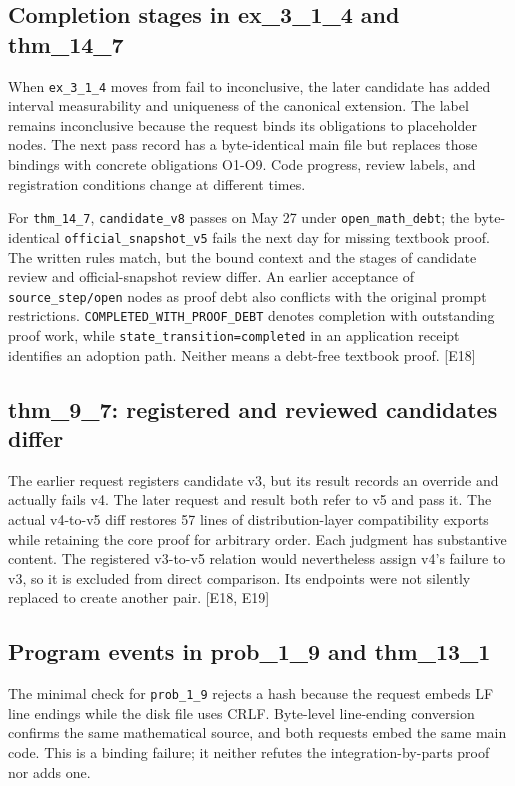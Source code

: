 \subsection[Completion stages in ex\_3\_1\_4 and thm\_14\_7]{\texorpdfstring{\protect\hypertarget{b6}{}Completion stages in ex\_3\_1\_4 and thm\_14\_7}{Completion stages in ex\_3\_1\_4 and thm\_14\_7}}
When \nolinkurl{ex_3_1_4} moves from fail to inconclusive, the later candidate has added interval measurability and uniqueness of the canonical extension. The label remains inconclusive because the request binds its obligations to placeholder nodes. The next pass record has a byte-identical main file but replaces those bindings with concrete obligations O1-O9. Code progress, review labels, and registration conditions change at different times.

For \nolinkurl{thm_14_7}, \nolinkurl{candidate_v8} passes on May 27 under \nolinkurl{open_math_debt}; the byte-identical \nolinkurl{official_snapshot_v5} fails the next day for missing textbook proof. The written rules match, but the bound context and the stages of candidate review and official-snapshot review differ. An earlier acceptance of \nolinkurl{source_step/open} nodes as proof debt also conflicts with the original prompt restrictions. \nolinkurl{COMPLETED_WITH_PROOF_DEBT} denotes completion with outstanding proof work, while \nolinkurl{state_transition=completed} in an application receipt identifies an adoption path. Neither means a debt-free textbook proof. [E18]

\subsection[thm\_9\_7: registered and reviewed candidates differ]{\texorpdfstring{\protect\hypertarget{b7}{}thm\_9\_7: registered and reviewed candidates differ}{thm\_9\_7: registered and reviewed candidates differ}}
The earlier request registers candidate v3, but its result records an override and actually fails v4. The later request and result both refer to v5 and pass it. The actual v4-to-v5 diff restores 57 lines of distribution-layer compatibility exports while retaining the core proof for arbitrary order. Each judgment has substantive content. The registered v3-to-v5 relation would nevertheless assign v4's failure to v3, so it is excluded from direct comparison. Its endpoints were not silently replaced to create another pair. [E18, E19]

\subsection[Program events in prob\_1\_9 and thm\_13\_1]{\texorpdfstring{\protect\hypertarget{b8}{}Program events in prob\_1\_9 and thm\_13\_1}{Program events in prob\_1\_9 and thm\_13\_1}}
The minimal check for \nolinkurl{prob_1_9} rejects a hash because the request embeds LF line endings while the disk file uses CRLF. Byte-level line-ending conversion confirms the same mathematical source, and both requests embed the same main code. This is a binding failure; it neither refutes the integration-by-parts proof nor adds one.

